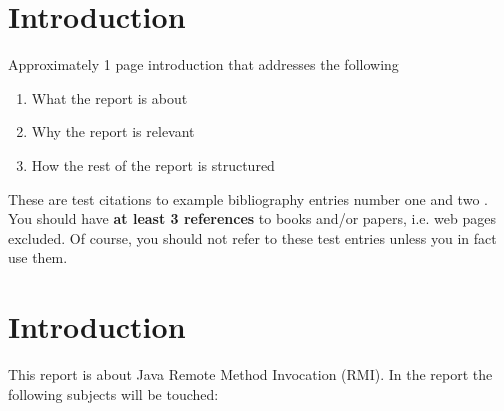 \chapter{Introduction}
Approximately 1 page introduction that addresses the following
\begin{enumerate}
\item What the report is about
\item Why the report is relevant
\item How the rest of the report is structured
\end{enumerate}

These are test citations to example bibliography entries number one
\cite{1989_graham_1} and two \cite{2003_simpson_1}. You should have
\textbf{at least 3 references} to books and/or papers, i.e. web pages
excluded. Of course, you should not refer to these test entries unless
you in fact use them.
\chapter{Introduction}
This report is about Java Remote Method Invocation (RMI). In the report the following subjects will be touched:
